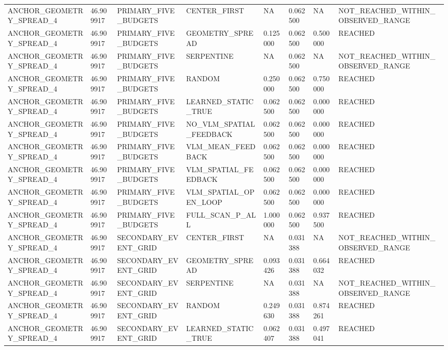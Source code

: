 \begin{tabular}{llllllll}
ANCHOR\_GEOMETRY\_SPREAD\_4 & 46.909917 & PRIMARY\_FIVE\_BUDGETS & CENTER\_FIRST & NA & 0.062500 & NA & NOT\_REACHED\_WITHIN\_OBSERVED\_RANGE \\
ANCHOR\_GEOMETRY\_SPREAD\_4 & 46.909917 & PRIMARY\_FIVE\_BUDGETS & GEOMETRY\_SPREAD & 0.125000 & 0.062500 & 0.500000 & REACHED \\
ANCHOR\_GEOMETRY\_SPREAD\_4 & 46.909917 & PRIMARY\_FIVE\_BUDGETS & SERPENTINE & NA & 0.062500 & NA & NOT\_REACHED\_WITHIN\_OBSERVED\_RANGE \\
ANCHOR\_GEOMETRY\_SPREAD\_4 & 46.909917 & PRIMARY\_FIVE\_BUDGETS & RANDOM & 0.250000 & 0.062500 & 0.750000 & REACHED \\
ANCHOR\_GEOMETRY\_SPREAD\_4 & 46.909917 & PRIMARY\_FIVE\_BUDGETS & LEARNED\_STATIC\_TRUE & 0.062500 & 0.062500 & 0.000000 & REACHED \\
ANCHOR\_GEOMETRY\_SPREAD\_4 & 46.909917 & PRIMARY\_FIVE\_BUDGETS & NO\_VLM\_SPATIAL\_FEEDBACK & 0.062500 & 0.062500 & 0.000000 & REACHED \\
ANCHOR\_GEOMETRY\_SPREAD\_4 & 46.909917 & PRIMARY\_FIVE\_BUDGETS & VLM\_MEAN\_FEEDBACK & 0.062500 & 0.062500 & 0.000000 & REACHED \\
ANCHOR\_GEOMETRY\_SPREAD\_4 & 46.909917 & PRIMARY\_FIVE\_BUDGETS & VLM\_SPATIAL\_FEEDBACK & 0.062500 & 0.062500 & 0.000000 & REACHED \\
ANCHOR\_GEOMETRY\_SPREAD\_4 & 46.909917 & PRIMARY\_FIVE\_BUDGETS & VLM\_SPATIAL\_OPEN\_LOOP & 0.062500 & 0.062500 & 0.000000 & REACHED \\
ANCHOR\_GEOMETRY\_SPREAD\_4 & 46.909917 & PRIMARY\_FIVE\_BUDGETS & FULL\_SCAN\_P\_ALL & 1.000000 & 0.062500 & 0.937500 & REACHED \\
ANCHOR\_GEOMETRY\_SPREAD\_4 & 46.909917 & SECONDARY\_EVENT\_GRID & CENTER\_FIRST & NA & 0.031388 & NA & NOT\_REACHED\_WITHIN\_OBSERVED\_RANGE \\
ANCHOR\_GEOMETRY\_SPREAD\_4 & 46.909917 & SECONDARY\_EVENT\_GRID & GEOMETRY\_SPREAD & 0.093426 & 0.031388 & 0.664032 & REACHED \\
ANCHOR\_GEOMETRY\_SPREAD\_4 & 46.909917 & SECONDARY\_EVENT\_GRID & SERPENTINE & NA & 0.031388 & NA & NOT\_REACHED\_WITHIN\_OBSERVED\_RANGE \\
ANCHOR\_GEOMETRY\_SPREAD\_4 & 46.909917 & SECONDARY\_EVENT\_GRID & RANDOM & 0.249630 & 0.031388 & 0.874261 & REACHED \\
ANCHOR\_GEOMETRY\_SPREAD\_4 & 46.909917 & SECONDARY\_EVENT\_GRID & LEARNED\_STATIC\_TRUE & 0.062407 & 0.031388 & 0.497041 & REACHED \\

\end{tabular}
